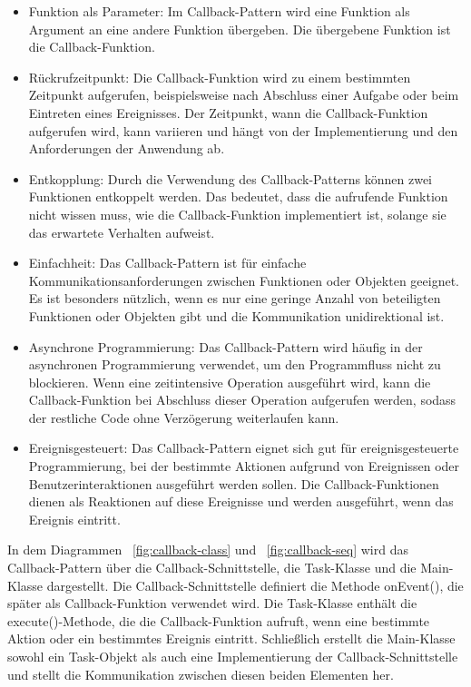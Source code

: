 \begin{itemize}
\item Funktion als Parameter: Im Callback-Pattern wird eine Funktion als Argument an eine andere Funktion übergeben. Die übergebene Funktion ist die Callback-Funktion.
\item Rückrufzeitpunkt: Die Callback-Funktion wird zu einem bestimmten Zeitpunkt aufgerufen, beispielsweise nach Abschluss einer Aufgabe oder beim Eintreten eines Ereignisses. Der Zeitpunkt, wann die Callback-Funktion aufgerufen wird, kann variieren und hängt von der Implementierung und den Anforderungen der Anwendung ab.
\item Entkopplung: Durch die Verwendung des Callback-Patterns können zwei Funktionen entkoppelt werden. Das bedeutet, dass die aufrufende Funktion nicht wissen muss, wie die Callback-Funktion implementiert ist, solange sie das erwartete Verhalten aufweist.
\item Einfachheit: Das Callback-Pattern ist für einfache Kommunikationsanforderungen zwischen Funktionen oder Objekten geeignet. Es ist besonders nützlich, wenn es nur eine geringe Anzahl von beteiligten Funktionen oder Objekten gibt und die Kommunikation unidirektional ist.
\item Asynchrone Programmierung: Das Callback-Pattern wird häufig in der asynchronen Programmierung verwendet, um den Programmfluss nicht zu blockieren. Wenn eine zeitintensive Operation ausgeführt wird, kann die Callback-Funktion bei Abschluss dieser Operation aufgerufen werden, sodass der restliche Code ohne Verzögerung weiterlaufen kann.
\item Ereignisgesteuert: Das Callback-Pattern eignet sich gut für ereignisgesteuerte Programmierung, bei der bestimmte Aktionen aufgrund von Ereignissen oder Benutzerinteraktionen ausgeführt werden sollen. Die Callback-Funktionen dienen als Reaktionen auf diese Ereignisse und werden ausgeführt, wenn das Ereignis eintritt.
\end{itemize}
In dem Diagrammen ~\ref{fig:callback-class} und ~\ref{fig:callback-seq} wird das Callback-Pattern über die Callback-Schnittstelle, die Task-Klasse und die Main-Klasse dargestellt. Die Callback-Schnittstelle definiert die Methode onEvent(), die später als Callback-Funktion verwendet wird. Die Task-Klasse enthält die execute()-Methode, die die Callback-Funktion aufruft, wenn eine bestimmte Aktion oder ein bestimmtes Ereignis eintritt. Schließlich erstellt die Main-Klasse sowohl ein Task-Objekt als auch eine Implementierung der Callback-Schnittstelle und stellt die Kommunikation zwischen diesen beiden Elementen her.\\\\

